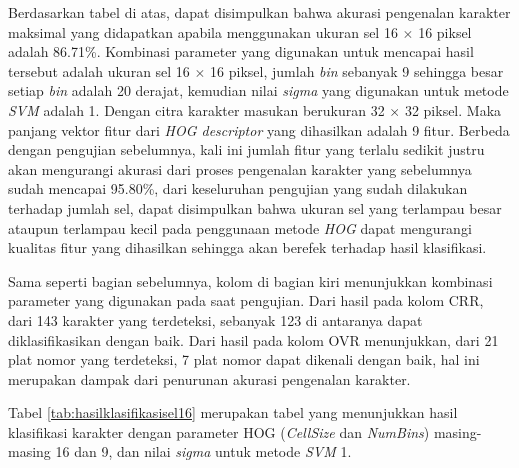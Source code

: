 \noindent Berdasarkan tabel di atas, dapat disimpulkan bahwa akurasi pengenalan karakter maksimal yang didapatkan apabila menggunakan ukuran sel 16 $\times$ 16 piksel adalah 86.71\%. Kombinasi parameter yang digunakan untuk mencapai hasil tersebut adalah ukuran sel 16 $\times$ 16 piksel, jumlah \textit{bin} sebanyak 9 sehingga besar setiap \textit{bin} adalah 20 derajat, kemudian nilai \textit{sigma} yang digunakan untuk metode \textit{SVM} adalah 1. Dengan citra karakter masukan berukuran 32 $\times$ 32 piksel. Maka panjang vektor fitur dari \textit{HOG descriptor} yang dihasilkan adalah 9 fitur. Berbeda dengan pengujian sebelumnya, kali ini jumlah fitur yang terlalu sedikit justru akan mengurangi akurasi dari proses pengenalan karakter yang sebelumnya sudah mencapai 95.80\%, dari keseluruhan pengujian yang sudah dilakukan terhadap jumlah sel, dapat disimpulkan bahwa ukuran sel yang terlampau besar ataupun terlampau kecil pada penggunaan metode \textit{HOG} dapat mengurangi kualitas fitur yang dihasilkan sehingga akan berefek terhadap hasil klasifikasi.

\noindent Sama seperti bagian sebelumnya, kolom di bagian kiri menunjukkan kombinasi parameter yang digunakan pada saat pengujian. Dari hasil pada kolom CRR, dari 143 karakter yang terdeteksi, sebanyak 123 di antaranya dapat diklasifikasikan dengan baik. Dari hasil pada kolom OVR menunjukkan, dari 21 plat nomor yang terdeteksi, 7 plat nomor dapat dikenali dengan baik, hal ini merupakan dampak dari penurunan akurasi pengenalan karakter.

\noindent Tabel \ref{tab:hasilklasifikasisel16} merupakan tabel yang menunjukkan hasil klasifikasi karakter dengan parameter HOG (\textit{CellSize} dan \textit{NumBins}) masing-masing 16 dan 9, dan nilai \textit{sigma} untuk metode \textit{SVM} 1.


